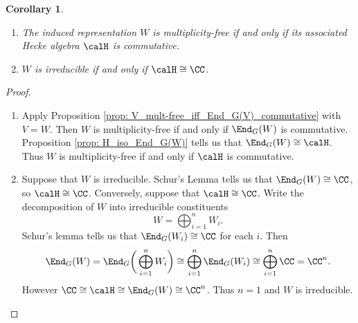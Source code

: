 \documentclass[11pt]{amsart}
\newtheorem{cor}[thm]{Corollary}
\theoremstyle{remark}
\begin{document}
\begin{cor}\label{cor: H_commutative}
	\begin{enumerate}[\itshape(i)]
		\item The induced representation $W$ is multiplicity-free if and only if its associated Hecke algebra $\calH$ is commutative.
		\item $W$ is irreducible if and only if $\calH \cong \CC$.
	\end{enumerate}
\end{cor}
\begin{proof}
	\begin{enumerate}[\itshape(i)]
		\item Apply Proposition \ref{prop: V_mult-free_iff_End_G(V)_commutative} with $V=W$.
		      Then $W$ is multiplicity-free if and only if $\End_G(W)$ is commutative.
		      Proposition \ref{prop: H_iso_End_G(W)} tells us that $\End_G(W)\cong\calH$.
		      Thus $W$ is multiplicity-free if and only if $\calH$ is commutative.

		\item Suppose that $W$ is irreducible.
		      Schur's Lemma tells us that $\End_G(W)\cong\CC$, so $\calH\cong\CC$.
		      Conversely, suppose that $\calH\cong\CC$.
		      Write the decomposition of $W$ into irreducible constituents
		      \[
			      W = \bigoplus_{i=1}^n W_i.
		      \]
		      Schur's lemma tells us that $\End_G(W_i)\cong \CC$ for each $i$.
		      Then
		      \[
			      \End_G(W) = \End_G\bigg(\bigoplus_{i=1}^n W_i\bigg) \cong \bigoplus_{i=1}^n \End_G(W_i) \cong \bigoplus_{i=1}^n \CC = \CC^n.
		      \]
		      However $\CC\cong\calH\cong\End_G(W)\cong\CC^n$.
		      Thus $n=1$ and $W$ is irreducible. \qedhere
	\end{enumerate}
\end{proof}

\end{document}
